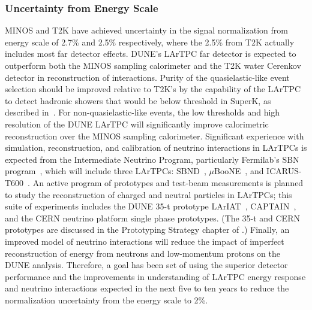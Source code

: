 \subsubsection{Uncertainty from \nue Energy Scale}
\label{sec:syst_just_fd}
MINOS and T2K have achieved uncertainty in the \nue signal normalization from \nue energy scale
of 2.7\% and 2.5\% respectively,
where the 2.5\% from T2K actually includes most far detector effects. DUNE's LArTPC far detector
is expected to outperform both the MINOS sampling calorimeter and the T2K water Cerenkov detector
in reconstruction of \nue interactions. Purity of the quasielastic-like event selection
should be improved relative to T2K's by the capability of the LArTPC to detect hadronic showers
that would be below threshold in SuperK, as described in~\cite{Mosel-Lalakulich-Gallmeister:2014}. For non-quasielastic-like
events, the low thresholds and high resolution of the DUNE LArTPC will significantly improve
calorimetric reconstruction over the MINOS sampling calorimeter.
Significant experience with simulation, reconstruction, and calibration
of neutrino interactions in LArTPCs is expected from the Intermediate Neutrino Program, particularly
Fermilab's SBN program~\cite{Antonello:2015lea},
which will include three LArTPCs: SBND~\cite{Admas:2013xka}, $\mu$BooNE~\cite{microboonetdr},
and ICARUS-T600~\cite{Rubbia:2011ft}. An active program of
prototypes and test-beam measurements is planned to study the reconstruction of charged and neutral particles
in LArTPCs; this suite of experiments includes the
DUNE 35-t prototype %
LArIAT~\cite{Adamson:2013/02/28tla},
CAPTAIN~\cite{Berns:2013usa}, and
the CERN neutrino platform single %
phase prototypes.
(The 35-t and CERN prototypes are discussed in the Prototyping Strategy chapter of \voldune.) 
Finally, an improved model of neutrino interactions will reduce the impact of imperfect reconstruction
of energy from neutrons and low-momentum protons on the DUNE analysis.
Therefore, a goal has been set of using the superior detector performance and the improvements
in understanding of LArTPC energy response and neutrino interactions
expected in the next five to ten years to reduce the normalization uncertainty
from the \nue energy scale to 2\%.

